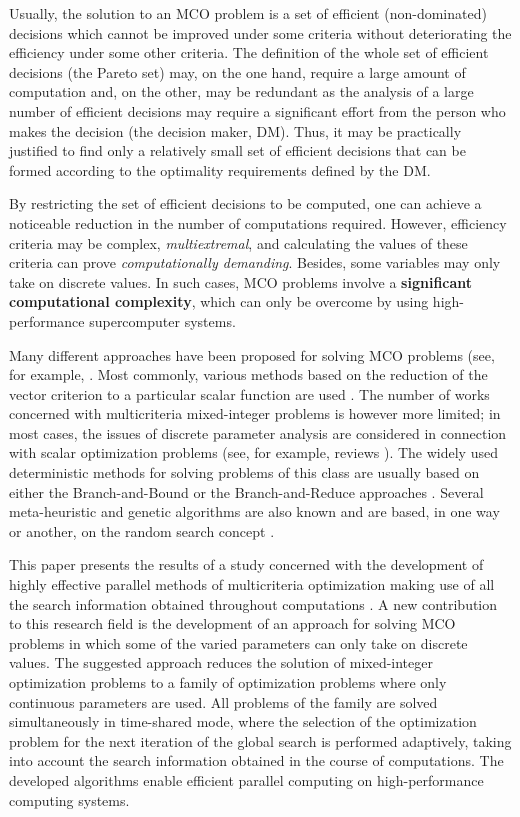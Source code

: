 \documentclass{svproc}
\begin{document}
Usually, the solution to an MCO problem is a set of efficient (non-dominated) decisions which cannot be improved under some criteria without deteriorating the efficiency under some other criteria. The definition of the whole set of efficient decisions (the Pareto set) may, on the one hand, require a large amount of computation and, on the other, may be redundant as the analysis of a large number of efficient decisions may require a significant effort from the person who makes the decision (the decision maker, DM). Thus, it may be practically justified to find only a relatively small set of efficient decisions that can be formed according to the optimality requirements defined by the DM.

By restricting the set of efficient decisions to be computed, one can achieve a noticeable reduction in the number of computations required. However, efficiency criteria may be complex, \textit{multiextremal}, and calculating the values of these criteria can prove \textit{computationally demanding}. Besides, some variables may only take on discrete values. In such cases, MCO problems involve a \textbf{significant computational complexity}, which can only be overcome by using high-performance supercomputer systems.

Many different approaches have been proposed for solving MCO problems (see, for example, \cite{c3,c6,c10,c11}.  Most commonly, various methods based on the reduction of the vector criterion to a particular scalar function are used \cite{c2,c12}. The number of works concerned with multicriteria mixed-integer problems is however more limited; in most cases, the issues of discrete parameter analysis are considered in connection with scalar optimization problems (see, for example, reviews \cite{c13,c14}). The widely used deterministic methods for solving problems of this class are usually based on either the Branch-and-Bound \cite{c15} or the Branch-and-Reduce approaches \cite{c16}. Several meta-heuristic and genetic algorithms are also known and are based, in one way or another, on the random search concept \cite{c17,c18}.

This paper presents the results of a study concerned with the development of highly effective parallel methods of multicriteria optimization making use of all the search information obtained throughout computations \cite{c19,c20,c21}. A new contribution to this research field is the development of an approach for solving MCO problems in which some of the varied parameters can only take on discrete values. The suggested approach reduces the solution of mixed-integer optimization problems to a family of optimization problems where only continuous parameters are used. All problems of the family are solved simultaneously in time-shared mode, where the selection of the optimization problem for the next iteration of the global search is performed adaptively, taking into account the search information obtained in the course of computations. The developed algorithms enable efficient parallel computing on high-performance computing systems.
\end{document}
